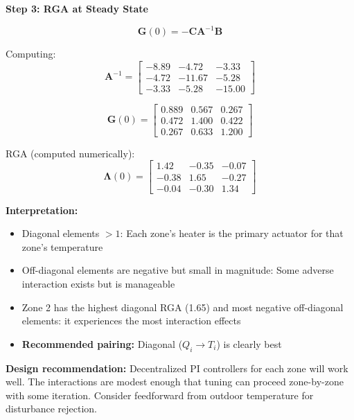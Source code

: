 \textbf{Step 3: RGA at Steady State}

\begin{equation}
\mathbf{G}(0) = -\mathbf{C}\mathbf{A}^{-1}\mathbf{B}
\end{equation}

Computing:
\begin{equation}
\mathbf{A}^{-1} = \begin{bmatrix} -8.89 & -4.72 & -3.33 \\ -4.72 & -11.67 & -5.28 \\ -3.33 & -5.28 & -15.00 \end{bmatrix}
\end{equation}

\begin{equation}
\mathbf{G}(0) = \begin{bmatrix} 0.889 & 0.567 & 0.267 \\ 0.472 & 1.400 & 0.422 \\ 0.267 & 0.633 & 1.200 \end{bmatrix}
\end{equation}

RGA (computed numerically):
\begin{equation}
\boldsymbol{\Lambda}(0) = \begin{bmatrix} 1.42 & -0.35 & -0.07 \\ -0.38 & 1.65 & -0.27 \\ -0.04 & -0.30 & 1.34 \end{bmatrix}
\end{equation}

\textbf{Interpretation:}
\begin{itemize}
\item Diagonal elements $> 1$: Each zone's heater is the primary actuator for that zone's temperature
\item Off-diagonal elements are negative but small in magnitude: Some adverse interaction exists but is manageable
\item Zone 2 has the highest diagonal RGA (1.65) and most negative off-diagonal elements: it experiences the most interaction effects
\item \textbf{Recommended pairing:} Diagonal ($Q_i \to T_i$) is clearly best
\end{itemize}

\textbf{Design recommendation:} Decentralized PI controllers for each zone will work well. The interactions are modest enough that tuning can proceed zone-by-zone with some iteration. Consider feedforward from outdoor temperature for disturbance rejection.


